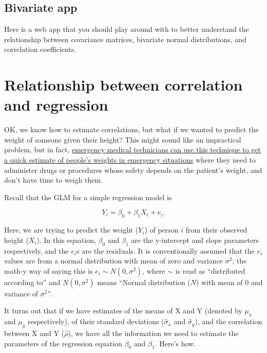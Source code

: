 \documentclass[]{book}
\begin{document}
\hypertarget{bivariate-app}{%
\subsection{Bivariate app}\label{bivariate-app}}

Here is a web app that you should play around with to better understand the relationship between covariance matrices, bivariate normal distributions, and correlation coefficients.

\hypertarget{relationship-between-correlation-and-regression}{%
\section{Relationship between correlation and regression}\label{relationship-between-correlation-and-regression}}

OK, we know how to estimate correlations, but what if we wanted to predict the weight of someone given their height? This might sound like an impractical problem, but in fact, \href{https://link.springer.com/article/10.1186/s12245-018-0212-9}{emergency medical technicians can use this technique to get a quick estimate of people's weights in emergency situations} where they need to administer drugs or procedures whose safety depends on the patient's weight, and don't have time to weigh them.

Recall that the GLM for a simple regression model is

\[Y_i = \beta_0 + \beta_1 X_i + e_i.\]

Here, we are trying to predict the weight (\(Y_i\)) of person \(i\) from their observed height (\(X_i\)). In this equation, \(\beta_0\) and \(\beta_1\) are the y-intercept and slope parameters respectively, and the \(e_i\)s are the residuals. It is conventionally assumed that the \(e_i\) values are from a normal distribution with mean of zero and variance \(\sigma^2\); the math-y way of saying this is \(e_i \sim N(0, \sigma^2)\), where \(\sim\) is read as ``distributed according to'' and \(N(0, \sigma^2)\) means ``Normal distribution (\(N\)) with mean of 0 and variance of \(\sigma^2\)''.

It turns out that if we have estimates of the means of X and Y (denoted by \(\mu_x\) and \(\mu_y\) respectively), of their standard deviations (\(\hat{\sigma}_x\) and \(\hat{\sigma}_y\)), and the correlation between X and Y (\(\hat{\rho}\)), we have all the information we need to estimate the parameters of the regression equation \(\beta_0\) and \(\beta_1\). Here's how.
\end{document}
